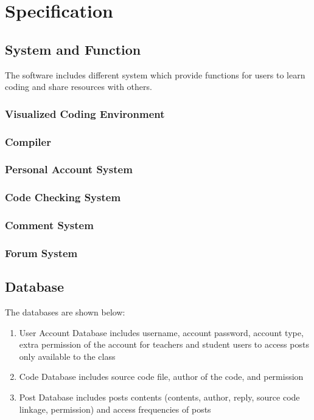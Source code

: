 \chapter{Specification}
\section{System and Function}
The software includes different system which provide functions for users to learn coding and share resources with others.
\subsection{Visualized Coding Environment}
	
\subsection{Compiler}
	
\subsection{Personal Account System}
	
\subsection{Code Checking System}
	
\subsection{Comment System}
	
\subsection{Forum System}
	
\section{Database}
The databases are shown below:
\begin{enumerate}
	\item User Account Database includes username, account password, account type, extra permission of the account for teachers and student users to access posts only available to the class
	\item Code Database includes source code file, author of the code, and permission
	\item Post Database includes posts contents (contents, author, reply, source code linkage, permission) and access frequencies of posts
\end{enumerate}
\newpage
